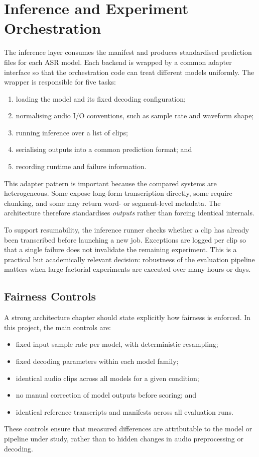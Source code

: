 \section{Inference and Experiment Orchestration}
The inference layer consumes the manifest and produces standardised prediction files for each ASR model. Each backend is wrapped by a common adapter interface so that the orchestration code can treat different models uniformly. The wrapper is responsible for five tasks:
\begin{enumerate}
    \item loading the model and its fixed decoding configuration;
    \item normalising audio I/O conventions, such as sample rate and waveform shape;
    \item running inference over a list of clips;
    \item serialising outputs into a common prediction format; and
    \item recording runtime and failure information.
\end{enumerate}

This adapter pattern is important because the compared systems are heterogeneous. Some expose long-form transcription directly, some require chunking, and some may return word- or segment-level metadata. The architecture therefore standardises \emph{outputs} rather than forcing identical internals.

To support resumability, the inference runner checks whether a clip has already been transcribed before launching a new job. Exceptions are logged per clip so that a single failure does not invalidate the remaining experiment. This is a practical but academically relevant decision: robustness of the evaluation pipeline matters when large factorial experiments are executed over many hours or days.

\subsection{Fairness Controls}
A strong architecture chapter should state explicitly how fairness is enforced. In this project, the main controls are:
\begin{itemize}
    \item fixed input sample rate per model, with deterministic resampling;
    \item fixed decoding parameters within each model family;
    \item identical audio clips across all models for a given condition;
    \item no manual correction of model outputs before scoring; and
    \item identical reference transcripts and manifests across all evaluation runs.
\end{itemize}
These controls ensure that measured differences are attributable to the model or pipeline under study, rather than to hidden changes in audio preprocessing or decoding.

